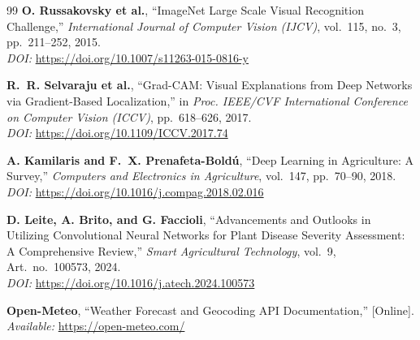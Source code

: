 \documentclass[a4paper,12pt,twoside]{report}
\numberwithin{equation}{section}
\begin{document}
\begin{thebibliography}{99}
\textbf{O. Russakovsky et al.}, ``ImageNet Large Scale Visual Recognition Challenge,'' \textit{International Journal of Computer Vision (IJCV)}, vol.~115, no.~3, pp.~211--252, 2015.\\
\textit{DOI:} \url{https://doi.org/10.1007/s11263-015-0816-y}

\textbf{R.~R. Selvaraju et al.}, ``Grad-CAM: Visual Explanations from Deep Networks via Gradient-Based Localization,'' in \textit{Proc. IEEE/CVF International Conference on Computer Vision (ICCV)}, pp.~618--626, 2017.\\
\textit{DOI:} \url{https://doi.org/10.1109/ICCV.2017.74}

\textbf{A. Kamilaris and F.~X. Prenafeta-Bold\'{u}}, ``Deep Learning in Agriculture: A Survey,'' \textit{Computers and Electronics in Agriculture}, vol.~147, pp.~70--90, 2018.\\
\textit{DOI:} \url{https://doi.org/10.1016/j.compag.2018.02.016}

\textbf{D. Leite, A. Brito, and G. Faccioli}, ``Advancements and Outlooks in Utilizing Convolutional Neural Networks for Plant Disease Severity Assessment: A Comprehensive Review,'' \textit{Smart Agricultural Technology}, vol.~9, Art.~no.~100573, 2024.\\
\textit{DOI:} \url{https://doi.org/10.1016/j.atech.2024.100573}

\textbf{Open-Meteo}, ``Weather Forecast and Geocoding API Documentation,'' [Online].\\
\textit{Available:} \url{https://open-meteo.com/}

\end{thebibliography}
\end{document}
